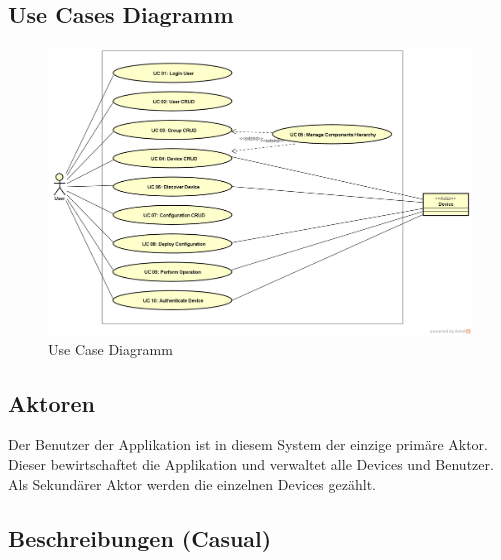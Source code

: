 \subsection{Use Cases Diagramm}
\begin{figure}[H]
\centering
\includegraphics[scale=0.42]{../02_Analyse/images/use_case_diagram.png}\caption{Use Case Diagramm}
\end{figure}

\subsection{Aktoren}
Der Benutzer der Applikation ist in diesem System der einzige primäre Aktor. Dieser bewirtschaftet die Applikation und verwaltet alle Devices und Benutzer. Als Sekundärer Aktor werden die einzelnen Devices gezählt.
\newpage
\subsection{Beschreibungen (Casual)}

